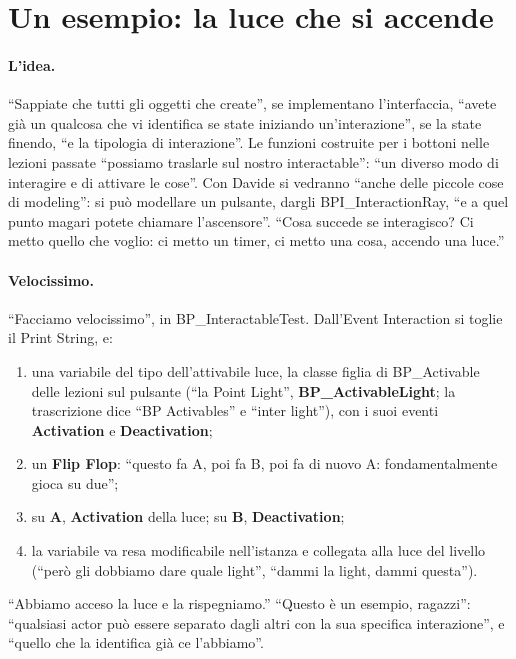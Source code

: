 \section{Un esempio: la luce che si accende}
\label{ue12:sec:luce}

\paragraph{L'idea.} ``Sappiate che tutti gli oggetti che create'', se implementano
l'interfaccia, ``avete già un qualcosa che vi identifica se state iniziando
un'interazione'', se la state finendo, ``e la tipologia di interazione''. Le funzioni
costruite per i bottoni nelle lezioni passate ``possiamo traslarle sul nostro
interactable'': ``un diverso modo di interagire e di attivare le cose''. Con Davide si
vedranno ``anche delle piccole cose di modeling'': si può modellare un pulsante, dargli
BPI\_InteractionRay, ``e a quel punto magari potete chiamare l'ascensore''. ``Cosa succede se
interagisco? Ci metto quello che voglio: ci metto un timer, ci metto una cosa, accendo una
luce.''

\paragraph{Velocissimo.} ``Facciamo velocissimo'', in BP\_InteractableTest. Dall'Event
Interaction si toglie il Print String, e:
\begin{enumerate}
  \item una variabile del tipo dell'attivabile luce, la classe figlia di BP\_Activable delle
        lezioni sul pulsante (``la Point Light'', \textbf{BP\_ActivableLight}; la
        trascrizione dice ``BP Activables'' e ``inter light''), con i suoi eventi
        \textbf{Activation} e \textbf{Deactivation};
  \item un \textbf{Flip Flop}: ``questo fa A, poi fa B, poi fa di nuovo A: fondamentalmente
        gioca su due'';
  \item su \textbf{A}, \textbf{Activation} della luce; su \textbf{B},
        \textbf{Deactivation};
  \item la variabile va resa modificabile nell'istanza e collegata alla luce del livello
        (``però gli dobbiamo dare quale light'', ``dammi la light, dammi questa'').
\end{enumerate}
``Abbiamo acceso la luce e la rispegniamo.'' ``Questo è un esempio, ragazzi'': ``qualsiasi
actor può essere separato dagli altri con la sua specifica interazione'', e ``quello che la
identifica già ce l'abbiamo''.

